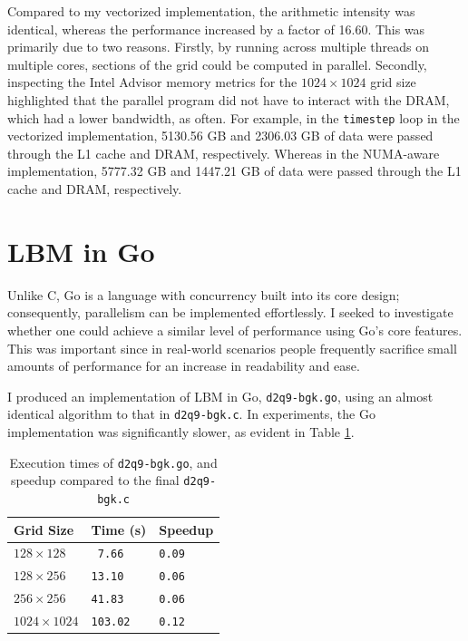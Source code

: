\documentclass[twocolumn, a4paper]{article}
\begin{document}
Compared to my vectorized implementation, the arithmetic intensity was identical, whereas the performance increased by a factor of 16.60.
This was primarily due to two reasons.
Firstly, by running across multiple threads on multiple cores, sections of the grid could be computed in parallel.
Secondly, inspecting the Intel Advisor memory metrics for the $1024\times1024$ grid size highlighted that the parallel program did not have to interact with the DRAM, which had a lower bandwidth, as often.
For example, in the \texttt{timestep} loop in the vectorized implementation, 5130.56 GB and 2306.03 GB of data were passed through the L1 cache and DRAM, respectively.
Whereas in the NUMA-aware implementation, 5777.32 GB and 1447.21 GB of data were passed through the L1 cache and DRAM, respectively. 

\section{LBM in Go}

Unlike C, Go is a language with concurrency built into its core design; consequently, parallelism can be implemented effortlessly.
I seeked to investigate whether one could achieve a similar level of performance using Go's core features.
This was important since in real-world scenarios people frequently sacrifice small amounts of performance for an increase in readability and ease.

I produced an implementation of LBM in Go, \texttt{d2q9-bgk.go}, using an almost identical algorithm to that in \texttt{d2q9-bgk.c}.
In experiments, the Go implementation was significantly slower, as evident in Table \ref{tab:go}.

\begin{table}[htbp]
  \begin{center}
  \caption{Execution times of \texttt{d2q9-bgk.go}, and speedup compared to the final \texttt{d2q9-bgk.c}}\label{tab:go}
  \begin{tabular}[t]{l | l l} 
      \hline\hline
      Grid Size&Time (s)&Speedup\\
      \hline
      $128 \times 128$&\texttt{ 7.66}&\texttt{0.09}\\
      $128 \times 256$&\texttt{13.10}&\texttt{0.06}\\
      $256 \times 256$&\texttt{41.83}&\texttt{0.06}\\
      $1024 \times 1024$&\texttt{103.02}&\texttt{0.12}\\
      \hline
    \end{tabular}
  \end{center}
\end{table}
\end{document}
